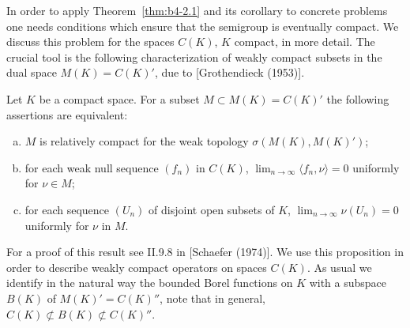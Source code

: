 In order to apply Theorem~\ref{thm:b4-2.1} and its corollary to concrete problems one
needs conditions which ensure that the semigroup is eventually compact.
We discuss this problem for the spaces $C(K)$, $K$ compact, in
more detail.
The crucial tool is the following characterization of
weakly compact subsets in the dual space $M(K) = C(K)'$, due to
[Grothendieck (1953)].

\begin{proposition}\label{prop:b4-2.3}
	Let $K$ be a compact space.
	For a subset $M \subset M(K) = C(K)'$ the following assertions are equivalent:
	
	\begin{enumerate}[(a)]
		\item 
		$M$ is relatively compact for the weak topology $\sigma(M(K),M(K)')$;
	
		\item 
		for each weak null sequence $(f_n)$ in $C(K)$, $\lim_{n\to\infty}\langle f_n,\nu \rangle = 0$ uniformly for $\nu \in M$;
	
		\item 
		for each sequence $(U_n)$ of disjoint open subsets of $K$, 
		$\lim_{n\to\infty}\nu(U_n) = 0$ uniformly for $\nu$ in $M$.
		\end{enumerate}
\end{proposition}
For a proof of this result see \eg II.9.8 in [Schaefer (1974)].
We use this proposition in order to describe weakly compact operators on spaces $C(K)$.
As usual we identify in the natural way the bounded
Borel functions on $K$ with a subspace $B(K)$ of $M(K)' = C(K)''$, note that in
general, $C(K) \not\subset B(K) \not\subset C(K)''$.

